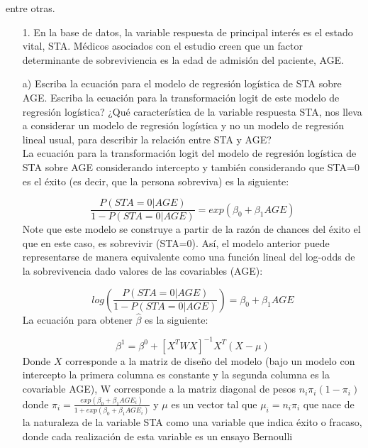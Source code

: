\documentclass[11pt,onside]{article}
\begin{document}
entre otras.

\begin{Schunk}
\end{Schunk}


\begin{itemize}
\item[1.] En la base de datos, la variable respuesta de principal interés es el estado vital, STA. Médicos asociados con el estudio creen que un factor determinante de sobreviviencia es la edad de admisión del paciente, AGE.


\item[a)] Escriba la ecuación para el modelo de regresión logística de STA sobre AGE. Escriba la ecuación para la transformación logit de este modelo de regresión logística? ¿Qué característica de la variable respuesta STA, nos lleva a considerar un modelo de regresión logística y no un modelo de regresión lineal usual, para describir la relación entre STA y AGE?\\


La ecuación para la transformación logit del modelo de regresión logística de STA sobre AGE considerando intercepto y también considerando que STA=0 es el éxito (es decir, que la persona sobreviva) es la siguiente:

$$\frac{P(STA=0|AGE)}{1-P(STA=0|AGE)}=exp(\beta_{0}+\beta_{1}AGE)$$ 
Note que este modelo se construye a partir de la razón de chances del éxito el que en este caso, es sobrevivir (STA=0). Así, el modelo anterior puede representarse de manera equivalente como una función lineal del log-odds de la sobrevivencia dado valores de las covariables (AGE):

$$log \left( \frac{P(STA=0|AGE)}{1-P(STA=0|AGE)} \right)=\beta_{0}+\beta_{1}AGE$$ 
La ecuación para obtener $\hat{\beta}$ es la siguiente:

$$\beta^{1}=\beta^{0}+[X^{T}WX]^{-1}X^{T}(X-\mu)$$
Donde $X$ corresponde a la matriz de diseño del modelo (bajo un modelo con intercepto la primera columna es constante y la segunda columna es la covariable AGE), W corresponde a la matriz diagonal de pesos $n_{i}\pi_{i}(1-\pi_{i})$ donde $\pi_{i}= {1+exp(\beta_{0}+\beta_{1}AGE_{i})}$ y $\mu$ es un vector tal que $\mu_{i}=n_{i}\pi_{i}$ que nace de la naturaleza de la variable STA como una variable que indica éxito o fracaso, donde cada realización de esta variable es un ensayo Bernoulli


\end{itemize}
\end{document}
